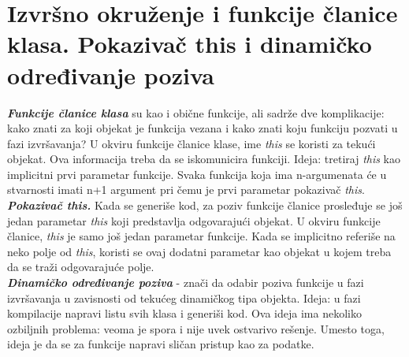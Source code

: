\documentclass[10pt]{extarticle}
\begin{document}
\section{Izvršno okruženje i funkcije članice klasa. Pokazivač this i dinamičko određivanje poziva}
\noindent
\textit{\textbf{Funkcije članice klasa}} su kao i obične funkcije, ali sadrže dve komplikacije: kako znati za koji objekat je funkcija vezana i kako znati koju funkciju pozvati u fazi izvršavanja? U okviru funkcije članice klase, ime \textit{this} se koristi za tekući objekat. Ova informacija treba da se iskomunicira funkciji. Ideja: tretiraj \textit{this} kao implicitni prvi parametar funkcije. Svaka funkcija koja ima n-argumenata će u stvarnosti imati n+1 argument pri čemu je prvi parametar pokazivač \textit{this}.\\
\textit{\textbf{Pokazivač this.}} Kada se generiše kod, za poziv funkcije članice prosleđuje se još jedan parametar \textit{this} koji predstavlja odgovarajući objekat. U okviru funkcije članice, \textit{this} je samo još jedan parametar funkcije. Kada se implicitno referiše na neko polje od \textit{this}, koristi se ovaj dodatni parametar kao objekat u kojem treba da se traži odgovarajuće polje.\\
\textit{\textbf{Dinamičko određivanje poziva}} - znači da odabir poziva funkcije u fazi izvršavanja u zavisnosti od tekućeg dinamičkog tipa objekta. Ideja: u fazi kompilacije napravi listu svih klasa i generiši kod. Ova ideja ima nekoliko ozbiljnih problema: veoma je spora i nije uvek ostvarivo rešenje. Umesto toga, ideja je da se za funkcije napravi sličan pristup kao za podatke.
\end{document}
